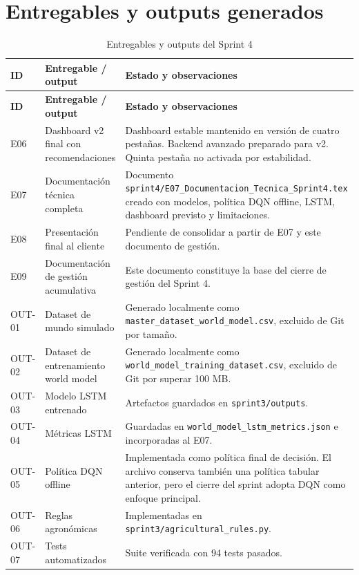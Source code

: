 \documentclass[11pt,a4paper]{article}
\begin{document}
\newpage

\section{Entregables y outputs generados}

\begin{longtable}{p{}p{}p{}}
\caption{Entregables y outputs del Sprint 4}\\
\toprule
\textbf{ID} & \textbf{Entregable / output} & \textbf{Estado y observaciones} \\
\midrule
\endfirsthead
\toprule
\textbf{ID} & \textbf{Entregable / output} & \textbf{Estado y observaciones} \\
\midrule
\endhead
E06 & Dashboard v2 final con recomendaciones & Dashboard estable mantenido en versión de cuatro pestañas. Backend avanzado preparado para v2. Quinta pestaña no activada por estabilidad. \\
E07 & Documentación técnica completa & Documento \texttt{sprint4/E07\_Documentacion\_Tecnica\_Sprint4.tex} creado con modelos, política DQN offline, LSTM, dashboard previsto y limitaciones. \\
E08 & Presentación final al cliente & Pendiente de consolidar a partir de E07 y este documento de gestión. \\
E09 & Documentación de gestión acumulativa & Este documento constituye la base del cierre de gestión del Sprint 4. \\
OUT-01 & Dataset de mundo simulado & Generado localmente como \texttt{master\_dataset\_world\_model.csv}, excluido de Git por tamaño. \\
OUT-02 & Dataset de entrenamiento world model & Generado localmente como \texttt{world\_model\_training\_dataset.csv}, excluido de Git por superar 100 MB. \\
OUT-03 & Modelo LSTM entrenado & Artefactos guardados en \texttt{sprint3/outputs}. \\
OUT-04 & Métricas LSTM & Guardadas en \texttt{world\_model\_lstm\_metrics.json} e incorporadas al E07. \\
OUT-05 & Política DQN offline & Implementada como política final de decisión. El archivo conserva también una política tabular anterior, pero el cierre del sprint adopta DQN como enfoque principal. \\
OUT-06 & Reglas agronómicas & Implementadas en \texttt{sprint3/agricultural\_rules.py}. \\
OUT-07 & Tests automatizados & Suite verificada con 94 tests pasados. \\
\bottomrule
\end{longtable}
\end{document}
